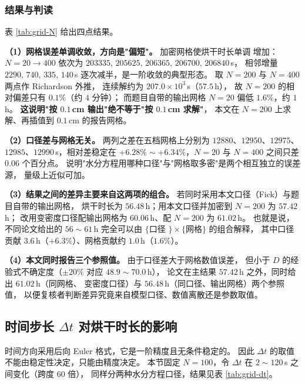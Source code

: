 \documentclass[12pt,a4paper,fontset=none]{ctexart}
\begin{document}
\subsubsection{结果与判读}

表 \ref{tab:grid-N} 给出四点结果。

\textbf{（1）网格误差单调收敛，方向是"偏短"。} 加密网格使烘干时长单调
增加：$N=20\to400$ 依次为 $203335,\,205625,\,206365,\,206700,\,206840$\,s，
相邻增量 $2290,\,740,\,335,\,140$\,s 逐次减半，是一阶收敛的典型形态。
取 $N=200$ 与 $N=400$ 两点作 Richardson 外推，
连续解约为 $207.0\times10^3$\,s（$57.5$\,h），
故 $N=200$ 的相对偏差只有 $0.1\%$（约 $4$ 分钟）；
而题目自带的输出网格 $N=20$ 偏低 $1.6\%$，约 $1$\,h。
\textbf{这说明"按 $0.1$\,cm 输出"绝不等于"按 $0.1$\,cm 求解"}，
本文在 $N=200$ 上求解、再插值到 $0.1$\,cm 的报告网格。

\textbf{（2）口径差与网格无关。} 两列之差在五档网格上分别为
$12880$、$12950$、$12975$、$12985$、$12990$\,s，相对差稳定在
$+6.28\%\sim+6.34\%$，$N=20$ 与 $N=400$ 之间只差 $0.06$ 个百分点。
说明"水分方程用哪种口径"与"网格取多密"是两个相互独立的误差源，
量级上近似可加。

\textbf{（3）结果之间的差异主要来自这两项的组合。}
若同时采用本文口径（Fick）与题目自带的输出网格，
烘干时长为 $56.48$\,h；用本文口径并加密到 $N=200$ 为 $57.42$\,h；
改用变密度口径配输出网格为 $60.06$\,h、配 $N=200$ 为 $61.02$\,h。
也就是说，不同论文给出的 $56\sim61$\,h 完全可以由
$\{$口径 $\}\times\{$网格$\}$ 的组合解释，
其中口径贡献 $3.6$\,h（$+6.3\%$）、网格贡献约 $1.0$\,h（$1.6\%$）。

\textbf{（4）本文同时报告三个参照值。} 由于口径差大于网格数值误差，
但小于 $D$ 的经验式不确定度（$\pm20\%$ 对应 $48.9\sim70.0$\,h），
论文在主结果 $57.42$\,h 之外，同时给出 $61.02$\,h（同网格、
变密度口径）与 $56.48$\,h（同口径、输出网格）两个参照值，
以便复核者判断差异究竟来自模型口径、数值离散还是参数取值。

\subsection{时间步长 $\Delta t$ 对烘干时长的影响}
\label{sec:timestep}

时间方向采用后向 Euler 格式，它是一阶精度且无条件稳定的。
因此 $\Delta t$ 的取值不能由稳定性决定，只能由精度决定。
本节固定 $N=100$，令 $\Delta t$ 在 $2\sim120$\,s 之间变化（跨度 $60$ 倍），
同样分两种水分方程口径，结果见表 \ref{tab:grid-dt}。
\end{document}
